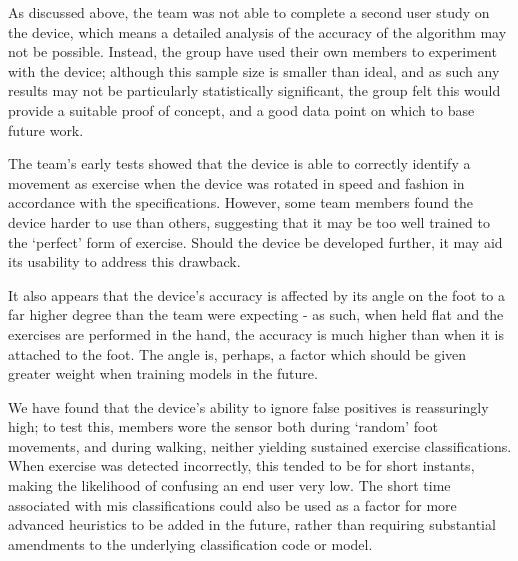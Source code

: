 
As discussed above, the team was not able to complete a second user study on the device, which means a detailed analysis of the accuracy of the algorithm may not be possible. Instead, the group have used their own members to experiment with the device; although this sample size is smaller than ideal, and as such any results may not be particularly statistically significant, the group felt this would provide a suitable proof of concept, and a good data point on which to base future work.

The team's early tests showed that the device is able to correctly identify a movement as exercise when the device was rotated in speed and fashion in accordance with the specifications. However, some team members found the device harder to use than others, suggesting that it may be too well trained to the `perfect' form of exercise. Should the device be developed further, it may aid its usability to address this drawback.

It also appears that the device's accuracy is affected by its angle on the foot to a far higher degree than the team were expecting - as such, when held flat and the exercises are performed in the hand, the accuracy is much higher than when it is attached to the foot. The angle is, perhaps, a factor which should be given greater weight when training models in the future.

We have found that the device's ability to ignore false positives is reassuringly high; to test this, members wore the sensor both during `random' foot movements, and during walking, neither yielding sustained exercise classifications. When exercise was detected incorrectly, this tended to be for short instants, making the likelihood of confusing an end user very low. The short time associated with mis classifications could also be used as a factor for more advanced heuristics to be added in the future, rather than requiring substantial amendments to the underlying classification code or model.
